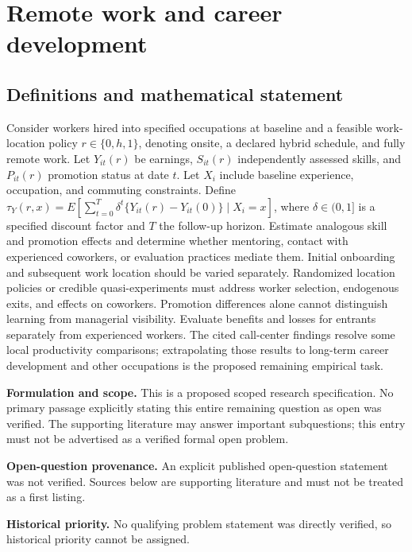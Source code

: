 \documentclass[11pt]{article}
\begin{document}
\section*{Remote work and career development}\label{30007640}
\subsection{Definitions and mathematical statement}
Consider workers hired into specified occupations at baseline and a feasible work-location policy \(r\in\{0,h,1\}\), denoting onsite, a declared hybrid schedule, and fully remote work. Let \(Y_{it}(r)\) be earnings, \(S_{it}(r)\) independently assessed skills, and \(P_{it}(r)\) promotion status at date \(t\). Let \(X_i\) include baseline experience, occupation, and commuting constraints. Define \(\tau_Y(r,x)=E[\sum_{t=0}^{T}\delta^t\{Y_{it}(r)-Y_{it}(0)\}\mid X_i=x]\), where \(\delta\in(0,1]\) is a specified discount factor and \(T\) the follow-up horizon. Estimate analogous skill and promotion effects and determine whether mentoring, contact with experienced coworkers, or evaluation practices mediate them. Initial onboarding and subsequent work location should be varied separately. Randomized location policies or credible quasi-experiments must address worker selection, endogenous exits, and effects on coworkers. Promotion differences alone cannot distinguish learning from managerial visibility. Evaluate benefits and losses for entrants separately from experienced workers. The cited call-center findings resolve some local productivity comparisons; extrapolating those results to long-term career development and other occupations is the proposed remaining empirical task.

\par\textbf{Formulation and scope.} This is a proposed scoped research specification. No primary passage explicitly stating this entire remaining question as open was verified. The supporting literature may answer important subquestions; this entry must not be advertised as a verified formal open problem.

\par\textbf{Open-question provenance.} An explicit published open-question statement was not verified. Sources below are supporting literature and must not be treated as a first listing.

\par\textbf{Historical priority.} No qualifying problem statement was directly verified, so historical priority cannot be assigned.
\end{document}
